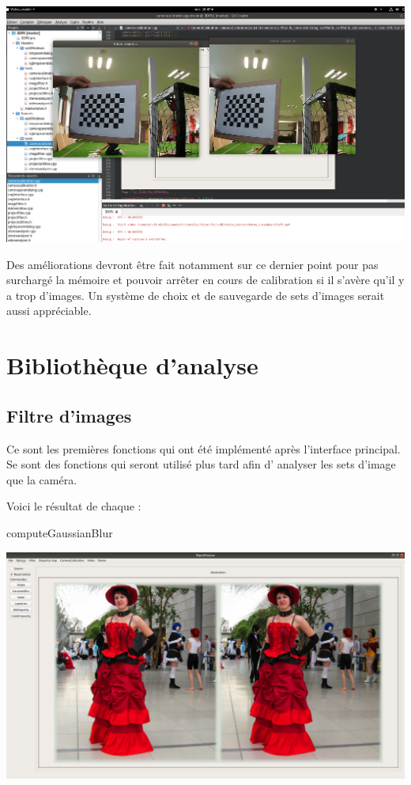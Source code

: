 \documentclass{article}
\begin{document}
\includegraphics[width=\linewidth]{img/video.png}

Des améliorations devront être fait notamment sur ce dernier point pour pas surchargé la mémoire et pouvoir arrêter en cours de calibration si il s’avère qu'il y a trop d'images.
Un système de choix et de sauvegarde de sets d'images serait aussi appréciable. 

\newpage
\section{Bibliothèque d'analyse}

\subsection{Filtre d'images}


Ce sont les premières fonctions qui ont été implémenté après l'interface principal. Se sont des fonctions qui seront utilisé plus tard  afin d' analyser les sets d'image que la caméra.

Voici le résultat de chaque :

computeGaussianBlur

\includegraphics[width=\linewidth]{img/blur.png}
\end{document}
